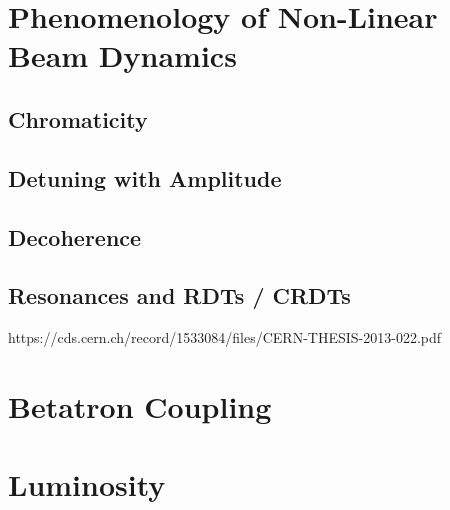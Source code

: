 \section{Phenomenology of Non-Linear Beam Dynamics}

\subsection{Chromaticity}

\subsection{Detuning with Amplitude}

\subsection{Decoherence}

\subsection{Resonances and RDTs / CRDTs}

https://cds.cern.ch/record/1533084/files/CERN-THESIS-2013-022.pdf


\section{Betatron Coupling}


\section{Luminosity}

